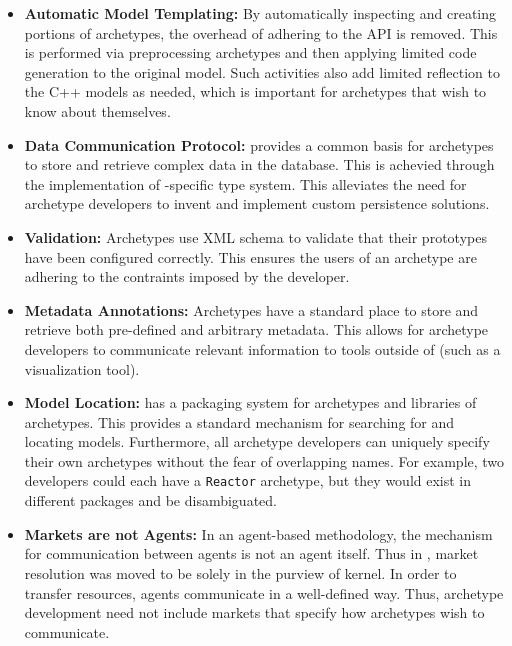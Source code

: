 \begin{itemize}
    \item \textbf{Automatic Model Templating:}  By automatically 
        inspecting and creating portions of archetypes, the overhead
        of adhering to the \cyclus \gls{API} is removed. This is performed 
        via preprocessing archetypes and then applying limited code generation
        to the original model. Such activities also 
        add limited reflection to the C++ models as needed, which is important 
        for archetypes that wish to know about themselves.

    \item \textbf{Data Communication Protocol:} \Cyclus 
        provides a common basis for archetypes to store and retrieve 
        complex data in the database. This is achevied through the 
        implementation of \Cyclus-specific type system.
        This alleviates the need for archetype
        developers to invent and implement custom persistence solutions.

    \item \textbf{Validation:} Archetypes use \gls{XML} schema to validate that 
        their prototypes have been configured correctly.
        This ensures the users of an archetype are adhering to the contraints
        imposed by the developer.

    \item \textbf{Metadata Annotations:} Archetypes have a standard place to 
        store and retrieve both pre-defined and arbitrary metadata.
        This allows for archetype developers to communicate relevant information
        to tools outside of \cyclus (such as a visualization tool).

    \item \textbf{Model Location:} \Cyclus has a packaging system for archetypes and 
        libraries of archetypes. This provides a standard mechanism for 
        searching for and locating models. 
        Furthermore, all archetype developers can 
        uniquely specify their own archetypes without the fear of overlapping 
        names.  For example, two developers could each have a \texttt{Reactor}
        archetype, but they would exist in different packages and be 
        disambiguated.

    \item \textbf{Markets are not Agents:} In an agent-based methodology, 
        the mechanism for communication between agents is not an agent itself.
        Thus in \cyclus, market resolution was moved to be solely in the purview 
        of kernel. In order to transfer resources, agents communicate 
        in a well-defined way. Thus, archetype development need not  
        include markets that specify how archetypes wish to communicate.

\end{itemize}

